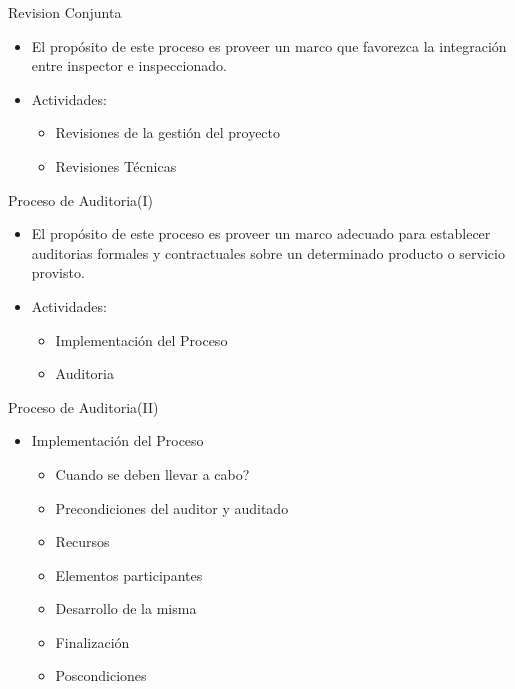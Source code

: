 \documentclass{beamer}
\begin{document}
				\begin{frame}{Revision Conjunta}
					\begin{itemize}
						\item El propósito de este proceso es proveer un marco que favorezca la integración entre inspector e inspeccionado.
						\item Actividades:
						
						\begin{itemize}
							\item Revisiones de la gestión del proyecto
							\item Revisiones Técnicas
						\end{itemize} 
					\end{itemize}
			
				\end{frame}
			
				\begin{frame}{Proceso de Auditoria(I)}
					\begin{itemize}
						\item El propósito de este proceso es proveer un marco adecuado para establecer auditorias formales y contractuales sobre un determinado producto o servicio provisto.
						\item Actividades:
						\begin{itemize}
							\item Implementación del Proceso
							\item Auditoria
						\end{itemize}

					\end{itemize}
				\end{frame}
			
			\begin{frame}{Proceso de Auditoria(II)}
				\begin{itemize}
					\item Implementación del Proceso
					\begin{itemize}
						\item Cuando se deben llevar a cabo?
						\item Precondiciones del auditor y auditado
						\item Recursos
						\item Elementos participantes
						\item Desarrollo de la misma
						\item Finalización
						\item Poscondiciones
					\end{itemize}
				\end{itemize}
			\end{frame}
			
\end{document}
